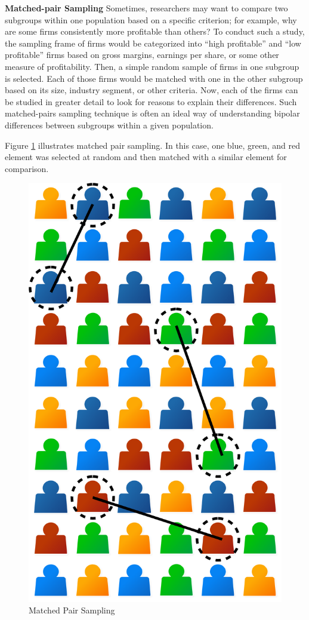 \textbf{Matched-pair Sampling} Sometimes, researchers may want to compare two subgroups within one population based on a specific criterion; for example, why are some firms consistently more profitable than others? To conduct such a study, the sampling frame of firms would be categorized into ``high profitable'' and ``low profitable'' firms based on gross margins, earnings per share, or some other measure of profitability. Then, a simple random sample of firms in one subgroup is selected. Each of those firms would be matched with one in the other subgroup based on its size, industry segment, or other criteria. Now, each of the firms can be studied in greater detail to look for reasons to explain their differences. Such matched-pairs sampling technique is often an ideal way of understanding bipolar differences between subgroups within a given population.

Figure \ref{07:fig06} illustrates matched pair sampling. In this case, one blue, green, and red element was selected at random and then matched with a similar element for comparison.

\begin{figure}[H]
	\centering
	\includegraphics[width=\maxwidth{.35\linewidth}]{gfx/07-06}
	\caption{Matched Pair Sampling}
	\label{07:fig06}
\end{figure}

